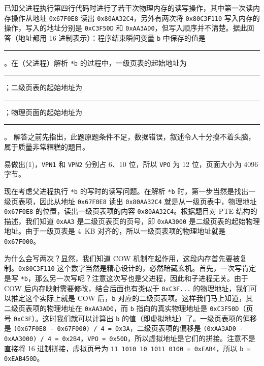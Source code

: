 \begin{problems}
        \qn 已知父进程执行第四行代码时进行了若干次物理内存的读写操作，其中第一次读内存操作从地址 \verb|0x67F0E8| 读出 \verb|0x80AA32C4|，另外有两次将 \verb|0x80C3F110| 写入内存的操作，写入的地址分别是 \verb|0xC3F50D| 和 \verb|0xAA3AD0|，但写入顺序并不清楚。据此回答（地址都用 16 进制表示）：程序结束瞬间变量 \verb|b| 中保存的值是\rule{2.5cm}{0.25mm}。在（父进程）解析 \verb|*b| 的过程中，一级页表的起始地址为 \rule{2.5cm}{0.25mm}；二级页表的起始地址为 \rule{2.5cm}{0.25mm}；物理页面的起始地址为 \rule{2.5cm}{0.25mm}。
        \sol 解答之前先指出，此题原题条件不足，数据错误，叙述令人十分摸不着头脑，属于质量非常糟糕的题目。

        易做出(1)，\verb|VPN1| 和 \verb|VPN2| 分别占 6、10 位，所以 \verb|VPO| 为 12 位，页面大小为 4096 字节。
        
        现在考虑父进程执行 \verb|*b| 的写时的读写问题。在解析 \verb|*b| 时，第一步当然是找出一级页表项，因此从地址 \verb|0x67F0E8| 读出 \verb|0x80AA32C4| 就是从一级页表中，物理地址 \verb|0x67F0E8| 的位置，读出一级页表项的内容 \verb|0x80AA32C4|。根据题目对 PTE 结构的描述，我们知道 \verb|0xAA3| 是二级页表页的页号，即 \verb|0xAA3000| 是二级页表的起始物理地址。由于一级页表是 \SI{4}{KB} 对齐的，所以一级页表项的物理地址就是 \verb|0x67F000|。

        为什么会写两次？显然，我们知道 COW 机制在起作用，这段内存首先要被复制。\verb|0x80C3F110| 这个数字当然是精心设计的，必然暗藏玄机。首先，一次写肯定是写 \verb|*b|，那么另一次写呢？注意这次写也是父进程，因此和子进程无关。由于 COW 后内存映射需要修改，结合后面也有类似于 \verb|0xC3F...| 的物理地址，我们可以推定这个实际上就是 COW 后，\verb|b| 对应的二级页表项。这样我们马上知道，其二级页表项的物理地址在 \verb|0xAA3AD0|，而 \verb|b| 指向的真实物理地址是 \verb|0xC3F50D|（页号 \verb|0xC3F|）。这时我们就可以计算出 \verb|b| 的值（即虚拟地址）了。一级页表项的偏移是 \verb|(0x67F0E8 - 0x67F000) / 4 = 0x3A|，二级页表项的偏移是 \verb|(0xAA3AD0 - 0xAA3000) / 4 = 0x2B4|，\verb|VPO = 0x50D|，所以虚拟地址是它们的拼接。注意不是直接将 16 进制拼接，虚拟页号为 \verb|11 1010 10 1011 0100 = 0xEAB4|，所以 \verb|b = 0xEAB450D|。


\end{problems}
